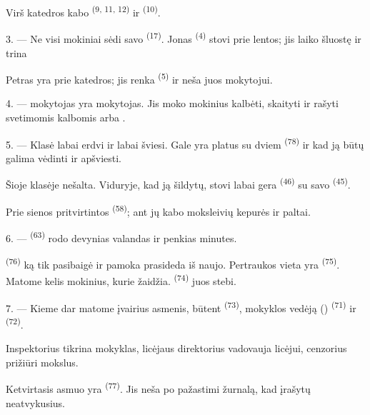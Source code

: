 Virš katedros kabo  \textsuperscript{(9, 11, 12)} ir
 \textsuperscript{(10)}.

3. --- Ne visi mokiniai sėdi savo  \textsuperscript{(17)}. Jonas
\textsuperscript{(4)} stovi prie lentos; jis laiko  šluostę ir trina

Petras yra prie katedros; jis renka  \textsuperscript{(5)} ir
neša juos mokytojui.

4. ---  mokytojas yra  mokytojas. Jis moko mokinius
kalbėti, skaityti ir rašyti svetimomis kalbomis  arba .

5. --- Klasė labai erdvi ir labai šviesi. Gale yra platus  su dviem
 \textsuperscript{(78)} ir  kad ją būtų
galima vėdinti ir apšviesti.

Šioje klasėje nešalta. Viduryje, kad ją šildytų, stovi labai gera 
\textsuperscript{(46)} su savo  \textsuperscript{(45)}.

Prie sienos pritvirtintos  \textsuperscript{(58)}; ant jų kabo
moksleivių kepurės ir paltai.

\VUsaut{5.2mm}
\VUsaut{3.6mm}

6. ---  \textsuperscript{(63)} rodo devynias valandas ir penkias
minutes.

 \textsuperscript{(76)} ką tik pasibaigė ir pamoka prasideda iš
naujo. Pertraukos vieta yra  \textsuperscript{(75)}. Matome kelis
mokinius, kurie žaidžia.  \textsuperscript{(74)} juos stebi.

7. --- Kieme dar matome įvairius asmenis, būtent 
\textsuperscript{(73)}, mokyklos vedėją ()
\textsuperscript{(71)} ir  \textsuperscript{(72)}.

Inspektorius tikrina mokyklas, licėjaus direktorius vadovauja licėjui, cenzorius
prižiūri mokslus.

Ketvirtasis asmuo yra  \textsuperscript{(77)}. Jis neša po
pažastimi žurnalą, kad įrašytų neatvykusius.

